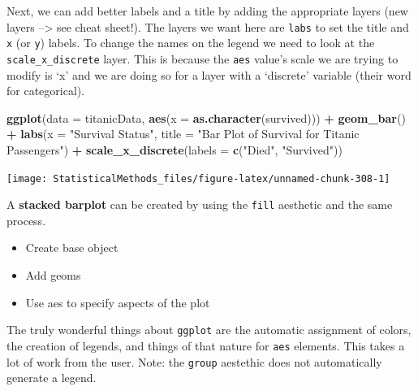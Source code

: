 \documentclass[
]{book}
\newenvironment{Shaded}{\begin{snugshade}}{\end{snugshade}}
\newcommand{\DataTypeTok}[1]{\textcolor[rgb]{0.13,0.29,0.53}{#1}}
\newcommand{\KeywordTok}[1]{\textcolor[rgb]{0.13,0.29,0.53}{\textbf{#1}}}
\newcommand{\NormalTok}[1]{#1}
\newcommand{\OperatorTok}[1]{\textcolor[rgb]{0.81,0.36,0.00}{\textbf{#1}}}
\newcommand{\StringTok}[1]{\textcolor[rgb]{0.31,0.60,0.02}{#1}}
\providecommand{\tightlist}{%
  \setlength{\itemsep}{0pt}\setlength{\parskip}{0pt}}
\theoremstyle{definition}
\theoremstyle{definition}
\theoremstyle{definition}
\theoremstyle{remark}
\begin{document}
Next, we can add better labels and a title by adding the appropriate layers (new layers --\textgreater{} see cheat sheet!). The layers we want here are \texttt{labs} to set the title and \texttt{x} (or \texttt{y}) labels. To change the names on the legend we need to look at the \texttt{scale\_x\_discrete} layer. This is because the \texttt{aes} value's scale we are trying to modify is `x' and we are doing so for a layer with a `discrete' variable (their word for categorical).

\begin{Shaded}
\begin{Highlighting}[]
\KeywordTok{ggplot}\NormalTok{(}\DataTypeTok{data =}\NormalTok{ titanicData, }\KeywordTok{aes}\NormalTok{(}\DataTypeTok{x =} \KeywordTok{as.character}\NormalTok{(survived))) }\OperatorTok{+}\StringTok{ }
\StringTok{  }\KeywordTok{geom_bar}\NormalTok{() }\OperatorTok{+}\StringTok{ }
\StringTok{  }\KeywordTok{labs}\NormalTok{(}\DataTypeTok{x =} \StringTok{"Survival Status"}\NormalTok{, }\DataTypeTok{title =} \StringTok{"Bar Plot of Survival for Titanic Passengers"}\NormalTok{) }\OperatorTok{+}\StringTok{ }
\StringTok{  }\KeywordTok{scale_x_discrete}\NormalTok{(}\DataTypeTok{labels =} \KeywordTok{c}\NormalTok{(}\StringTok{"Died"}\NormalTok{, }\StringTok{"Survived"}\NormalTok{))}
\end{Highlighting}
\end{Shaded}

\begin{center}\texttt{[image: StatisticalMethods\_files/figure-latex/unnamed-chunk-308-1]} \end{center}

A \textbf{stacked barplot} can be created by using the \texttt{fill} aesthetic and the same process.

\begin{itemize}
\tightlist
\item
  Create base object\\
\item
  Add geoms\\
\item
  Use aes to specify aspects of the plot
\end{itemize}

The truly wonderful things about \texttt{ggplot} are the automatic assignment of colors, the creation of legends, and things of that nature for \texttt{aes} elements. This takes a lot of work from the user. Note: the \texttt{group} aestethic does not automatically generate a legend.
\end{document}
